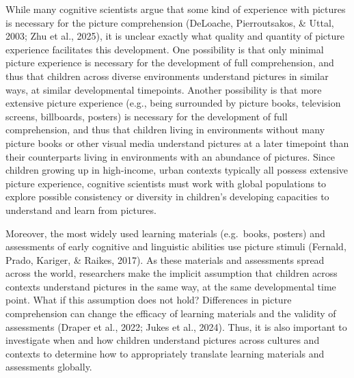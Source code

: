 \documentclass[10pt, letterpaper]{article}
\begin{document}
While many cognitive scientists argue that some kind of experience with
pictures is necessary for the picture comprehension (DeLoache,
Pierroutsakos, \& Uttal, 2003; Zhu et al., 2025), it is unclear exactly
what quality and quantity of picture experience facilitates this
development. One possibility is that only minimal picture experience is
necessary for the development of full comprehension, and thus that
children across diverse environments understand pictures in similar
ways, at similar developmental timepoints. Another possibility is that
more extensive picture experience (e.g., being surrounded by picture
books, television screens, billboards, posters) is necessary for the
development of full comprehension, and thus that children living in
environments without many picture books or other visual media understand
pictures at a later timepoint than their counterparts living in
environments with an abundance of pictures. Since children growing up in
high-income, urban contexts typically all possess extensive picture
experience, cognitive scientists must work with global populations to
explore possible consistency or diversity in children's developing
capacities to understand and learn from pictures.

Moreover, the most widely used learning materials (e.g.~books, posters)
and assessments of early cognitive and linguistic abilities use picture
stimuli (Fernald, Prado, Kariger, \& Raikes, 2017). As these materials
and assessments spread across the world, researchers make the implicit
assumption that children across contexts understand pictures in the same
way, at the same developmental time point. What if this assumption does
not hold? Differences in picture comprehension can change the efficacy
of learning materials and the validity of assessments (Draper et al.,
2022; Jukes et al., 2024). Thus, it is also important to investigate
when and how children understand pictures across cultures and contexts
to determine how to appropriately translate learning materials and
assessments globally.
\end{document}
